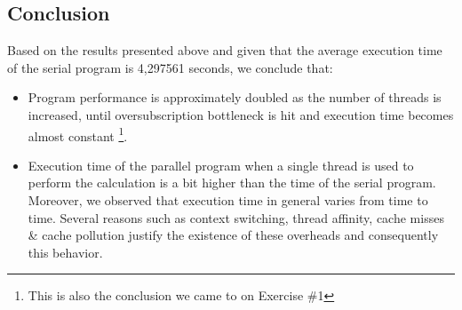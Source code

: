 \documentclass{article}
\begin{document}
\pagebreak

\subsection{Conclusion}
Based on the results presented above and given that the average execution time of the serial
program is 4,297561 seconds, we conclude that:

\begin{itemize}
 \item Program performance is approximately doubled as the number of threads is increased, until
       oversubscription bottleneck is hit and execution time becomes almost constant
       \footnote{This is also the conclusion we came to on Exercise \#1}.
 \item Execution time of the parallel program when a single thread is used to perform the
       calculation is a bit higher than the time of the serial program. Moreover, we observed
       that execution time in general varies from time to time. Several reasons such as context
       switching, thread affinity, cache misses \& cache pollution justify the existence of
       these overheads and consequently this behavior.
\end{itemize}
\end{document}
